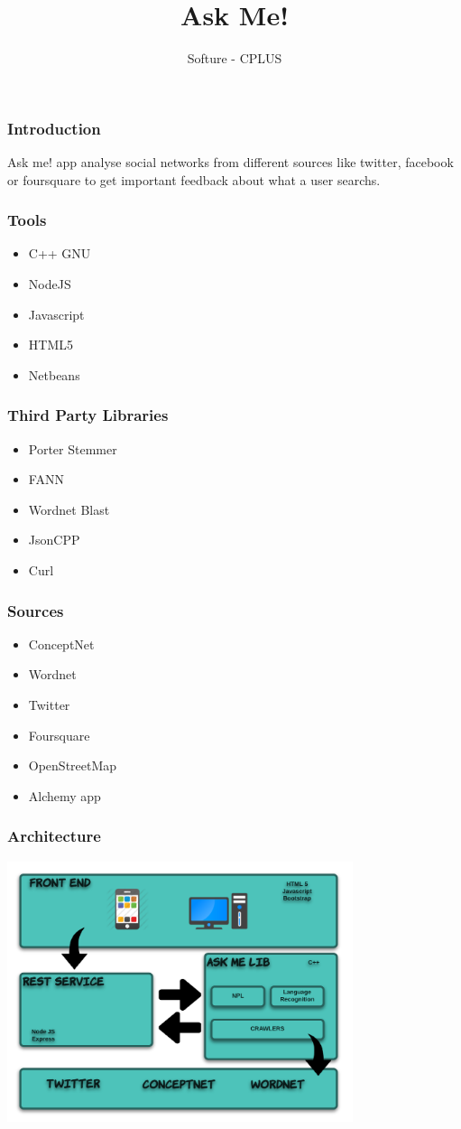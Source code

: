 \documentclass{beamer}
\title{Ask Me!}
\author{Softure - CPLUS}
\begin{document}
\maketitle
\begin{frame}
\frametitle{Introduction}
Ask me! app analyse social networks from different sources like twitter, facebook or foursquare to get important feedback about what a user searchs.
\end{frame}
\begin{frame}
\frametitle{Tools}
\begin{itemize}
\item C++ GNU
\item NodeJS
\item Javascript
\item HTML5
\item Netbeans
\end{itemize}
\end{frame}

\begin{frame}
\frametitle{Third Party Libraries}
\begin{itemize}
\item Porter Stemmer
\item FANN
\item Wordnet Blast
\item JsonCPP
\item Curl
\end{itemize}
\end{frame}

\begin{frame}
\frametitle{Sources}
\begin{itemize}
\item ConceptNet
\item Wordnet
\item Twitter
\item Foursquare
\item OpenStreetMap
\item Alchemy app
\end{itemize}
\end{frame}

\begin{frame}
\frametitle{Architecture}
\begin{center}
\includegraphics[height=3.0in]{AskMeArchitecture.png}
\end{center}
\end{frame}
\end{document}
